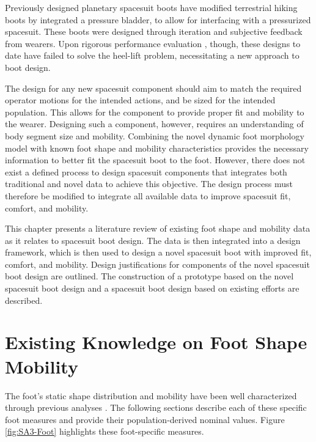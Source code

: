\documentclass[defaultstyle,11pt]{comps}
\begin{document}
Previously designed planetary spacesuit boots have modified terrestrial hiking boots by integrated a pressure bladder, to allow for interfacing with a pressurized spacesuit.
These boots were designed through iteration and subjective feedback from wearers.
Upon rigorous performance evaluation \citep{Ross2002, Fineman2018}, though, these designs to date have failed to solve the heel-lift problem, necessitating a new approach to boot design.

The design for any new spacesuit component should aim to match the required operator motions for the intended actions, and be sized for the intended population.
This allows for the component to provide proper fit and mobility to the wearer.
Designing such a component, however, requires an understanding of body segment size and mobility.
Combining the novel dynamic foot morphology model with known foot shape and mobility characteristics provides the necessary information to better fit the spacesuit boot to the foot.
However, there does not exist a defined process to design spacesuit components that integrates both traditional and novel data to achieve this objective.
The design process must therefore be modified to integrate all available data to improve spacesuit fit, comfort, and mobility.

This chapter presents a literature review of existing foot shape and mobility data as it relates to spacesuit boot design.
The data is then integrated into a design framework, which is then used to design a novel spacesuit boot with improved fit, comfort, and mobility.
Design justifications for components of the novel spacesuit boot design are outlined.
The construction of a prototype based on the novel spacesuit boot design and a spacesuit boot design based on existing efforts are described.

\hypertarget{existing-knowledge-on-foot-shape-mobility}{%
\section{Existing Knowledge on Foot Shape Mobility}\label{existing-knowledge-on-foot-shape-mobility}}

The foot's static shape distribution and mobility have been well characterized through previous analyses \citep{Farris2019, Mann1979, Voloshina2013, Wannop2014}.
The following sections describe each of these specific foot measures and provide their population-derived nominal values.
Figure \ref{fig:SA3-Foot} highlights these foot-specific measures.
\end{document}
